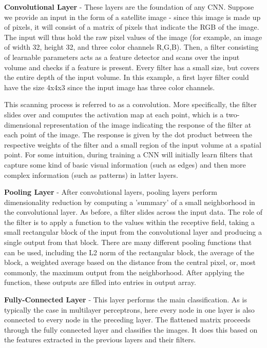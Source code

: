 \documentclass[11pt, a4paper, leqno]{article}
\begin{document}
\textbf{Convolutional Layer} - These layers are the foundation of any CNN. Suppose we provide an input in the form of a satellite image - since this image is made up of pixels, it will consist of a matrix of pixels that indicate the RGB of the image. The input will thus hold the raw pixel values of the image (for example, an image of width 32, height 32, and three color channels R,G,B). Then, a filter consisting of learnable parameters acts as a feature detector and scans over the input volume and checks if a feature is present. Every filter has a small size, but covers the entire depth of the input volume. In this example, a first layer filter could have the size 4x4x3 since the input image has three color channels. 

This scanning process is referred to as a convolution. More specifically, the filter slides over and computes the activation map at each point, which is a two-dimensional representation of the image indicating the response of the filter at each point of the image. The response is given by the dot product between the respective weights of the filter and a small region of the input volume at a spatial point. For some intuition, during training a CNN will initially learn filters that capture some kind of basic visual information (such as edges) and then more complex information (such as patterns) in latter layers. 

\noindent \textbf{Pooling Layer} - After convolutional layers, pooling layers perform dimensionality reduction by computing a 'summary' of a small neighborhood in the convolutional layer. As before, a filter slides across the input data. The role of the filter is to apply a function to the values within the receptive field, taking a small rectangular block of the input from the convolutional layer and producing a single output from that block. There are many different pooling functions that can be used, including the L2 norm of the rectangular block, the average of the block, a weighted average based on the distance from the central pixel, or, most commonly, the maximum output from the neighborhood. After applying the function, these outputs are filled into entries in output array. 

\noindent \textbf{Fully-Connected Layer} - This layer performs the main classification. As is typically the case in multilayer perceptrons, here every node in one layer is also connected to every node in the preceding layer. The flattened matrix proceeds through the fully connected layer and classifies the images. It does this based on the features extracted in the previous layers and their filters.
\end{document}
